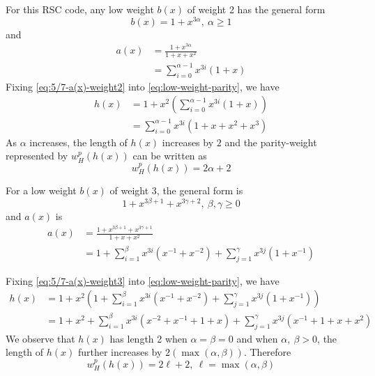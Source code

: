 \documentclass[11pt, oneside, dvipdfmx]{book}
\begin{document}
\begin{example}[5/7 RSC code, $f(x)=1+x^2,~g(x)=1+x+x^2$]
For this RSC code, any low weight $b(x)$ of weight 2 has the general form 
\begin{equation}
b(x)=1+x^{3\alpha},~\alpha \geq 1
\label{eq:5/7-weight-2}
\end{equation}
and 
\begin{equation}
\begin{split}
a(x)&=\frac{1+x^{3\alpha}}{1+x+x^2}\\
&=\sum_{i=0}^{\alpha-1}x^{3i}\left(1+x\right)
\end{split}
\label{eq:5/7-a(x)-weight2}
\end{equation}
Fixing \eqref{eq:5/7-a(x)-weight2} into \eqref{eq:low-weight-parity}, we have 
\begin{equation}
\begin{split}
h(x)&=1+x^2\left(\sum_{i=0}^{\alpha-1}x^{3i}\left(1+x\right)\right)\\
&=\sum_{i=0}^{\alpha-1}x^{3i}\left(1+x+x^2+x^3\right)
\end{split}
\label{eq:5/7-h(x)-weight2}
\end{equation}
As $\alpha$ increases, the length of $h(x)$ increases by $2$ and the parity-weight represented by $w_H^{p}(h(x))$ can be written as $$w_H^{p}(h(x))=2\alpha+2$$

For a low weight $b(x)$ of weight 3, the general form is 
\begin{equation}
1+x^{3\beta +1}+x^{3\gamma+2},~\beta,\gamma \geq 0
\label{eq:5/7-weight-3}
\end{equation}
and $a(x)$ is 
\begin{equation}
\begin{split}
a(x)&=\frac{1+x^{3\beta +1}+x^{3\gamma+1}}{1+x+x^2}\\
&=1+\sum_{i=1}^{\beta}x^{3i}\left(x^{-1}+x^{-2}\right) + \sum_{j=1}^{\gamma}x^{3j}\left(1+x^{-1}\right)
\end{split}
\label{eq:5/7-a(x)-weight3}
\end{equation}

Fixing \eqref{eq:5/7-a(x)-weight3} into \eqref{eq:low-weight-parity}, we have 
\begin{equation}
\begin{split}
h(x)&=1+x^2\left(1+\sum_{i=1}^{\beta}x^{3i}\left(x^{-1}+x^{-2}\right) + \sum_{j=1}^{\gamma}x^{3j}\left(1+x^{-1}\right)\right)\\
&=1+x^2+\sum_{i=1}^{\beta}x^{3i}\left(x^{-2}+x^{-1}+1+x\right) + \sum_{j=1}^{\gamma}x^{3j}\left(x^{-1}+1+x+x^2\right)
\end{split}
\label{eq:5/7-h(x)-weight-3}
\end{equation}
We observe that $h(x)$ has length 2 when $\alpha =\beta =0$ and when $\alpha,~\beta>0$, the length of $h(x)$ further increases by $2(\max(\alpha,\beta))$. Therefore
$$w_H^{p}(h(x))=2\ell+2,~\ell=\max(\alpha,\beta)$$

\end{example}
\end{document}
